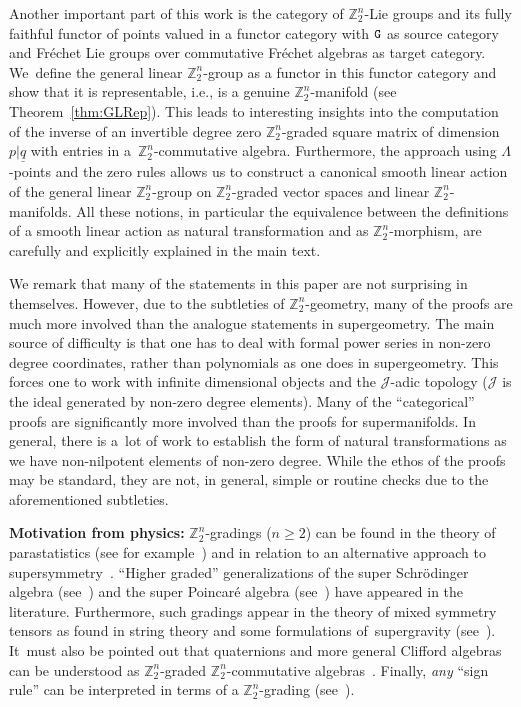 \documentclass[pdftex]{sigma}%
\newcommand{\Z}{{\mathbb Z}}
\def\ul{\underline}
\def\ul{\underline}
\newcommand{\0}{\otimes}
\newcommand{\z}{\Z_2^n}
\numberwithin{equation}{section}
\begin{document}
Another important part of this work is the category of $\z$-Lie groups and its fully faithful functor of points valued in a functor category with ${\tt G}$ as source category and Fr\'echet Lie groups over commutative Fr\'echet algebras as target category. We~define the general linear $\Z_2^n$-group as a functor in this functor category and show that it is representable, i.e., is a genuine $\Z_2^n$-manifold (see Theorem~\ref{thm:GLRep}). This leads to interesting insights into the computation of the inverse of an invertible degree zero $\z$-graded square matrix of dimension $p|\ul q$ with entries in a~$\z$-commutative algebra. Furthermore, the approach using $\Lambda$-points and the zero rules allows us to construct a canonical smooth linear action of the general linear $\Z_2^n$-group on $\Z_2^n$-graded vector spaces and linear $\Z_2^n$-manifolds. All these notions, in particular the equivalence between the definitions of a smooth linear action as natural transformation and as $\z$-morphism, are carefully and explicitly explained in the main text.

We remark that many of the statements in this paper are not surprising in themselves. However, due to the subtleties of $\Z_2^n$-geometry, many of the proofs are much more involved than the analogue statements in supergeometry. The main source of difficulty is that one has to deal with formal power series in non-zero degree coordinates, rather than polynomials as one does in supergeometry. This forces one to work with infinite dimensional objects and the $\mathcal{J}$-adic topology ($\mathcal{J}$ is the ideal generated by non-zero degree elements). Many of the ``categorical'' proofs are significantly more involved than the proofs for supermanifolds. In general, there is a~lot of work to establish the form of natural transformations as we have non-nilpotent elements of non-zero degree. While the ethos of the proofs may be standard, they are not, in general, simple or routine checks due to the aforementioned subtleties.


\textbf{Motivation from physics:} $\Z_{2}^{n}$-gradings ($n \geq 2$) can be found in the theory of parastatistics (see for example~\cite{Druhl:1970,Green:1953,Greenberg:1965,Yang:2001}) and in relation to an alternative approach to supersymmetry~\cite{Aizawa:2018,Aizawa:2016,Tolstoy:2013}. ``Higher graded'' generalizations of the super Schr\"{o}dinger algebra (see~\cite{Aizawa:2017}) and the super Poincar\'{e} algebra (see~\cite{Bruce:2019a}) have appeared in the literature. Furthermore, such gradings appear in the theory of mixed symmetry tensors as found in string theory and some formulations of~supergravity (see~\cite{Bruce:2018a}). It~must also be pointed out that quaternions and more general Clifford algebras can be understood as $\Z_2^n$-graded $\Z_2^n$-commutative algebras~\cite{Albuquerque:1999, Albuquerque:2002}. Finally, \emph{any} ``sign rule'' can be interpreted in terms of a $\Z_{2}^{n}$-grading (see~\cite{Covolo:2016}).
\end{document}
